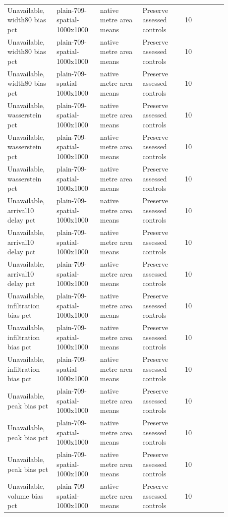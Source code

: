 \begin{longtable}{p{0.1760\linewidth}p{0.1760\linewidth}p{0.1760\linewidth}p{0.1760\linewidth}p{0.1760\linewidth}}
Unavailable, width80 bias pct & plain-709-spatial-1000x1000 & native metre area means & Preserve assessed controls & 10 \\
Unavailable, width80 bias pct & plain-709-spatial-1000x1000 & native metre area means & Preserve assessed controls & 10 \\
Unavailable, width80 bias pct & plain-709-spatial-1000x1000 & native metre area means & Preserve assessed controls & 10 \\
Unavailable, wasserstein pct & plain-709-spatial-1000x1000 & native metre area means & Preserve assessed controls & 10 \\
Unavailable, wasserstein pct & plain-709-spatial-1000x1000 & native metre area means & Preserve assessed controls & 10 \\
Unavailable, wasserstein pct & plain-709-spatial-1000x1000 & native metre area means & Preserve assessed controls & 10 \\
Unavailable, arrival10 delay pct & plain-709-spatial-1000x1000 & native metre area means & Preserve assessed controls & 10 \\
Unavailable, arrival10 delay pct & plain-709-spatial-1000x1000 & native metre area means & Preserve assessed controls & 10 \\
Unavailable, arrival10 delay pct & plain-709-spatial-1000x1000 & native metre area means & Preserve assessed controls & 10 \\
Unavailable, infiltration bias pct & plain-709-spatial-1000x1000 & native metre area means & Preserve assessed controls & 10 \\
Unavailable, infiltration bias pct & plain-709-spatial-1000x1000 & native metre area means & Preserve assessed controls & 10 \\
Unavailable, infiltration bias pct & plain-709-spatial-1000x1000 & native metre area means & Preserve assessed controls & 10 \\
Unavailable, peak bias pct & plain-709-spatial-1000x1000 & native metre area means & Preserve assessed controls & 10 \\
Unavailable, peak bias pct & plain-709-spatial-1000x1000 & native metre area means & Preserve assessed controls & 10 \\
Unavailable, peak bias pct & plain-709-spatial-1000x1000 & native metre area means & Preserve assessed controls & 10 \\
Unavailable, volume bias pct & plain-709-spatial-1000x1000 & native metre area means & Preserve assessed controls & 10 \\

\end{longtable}

